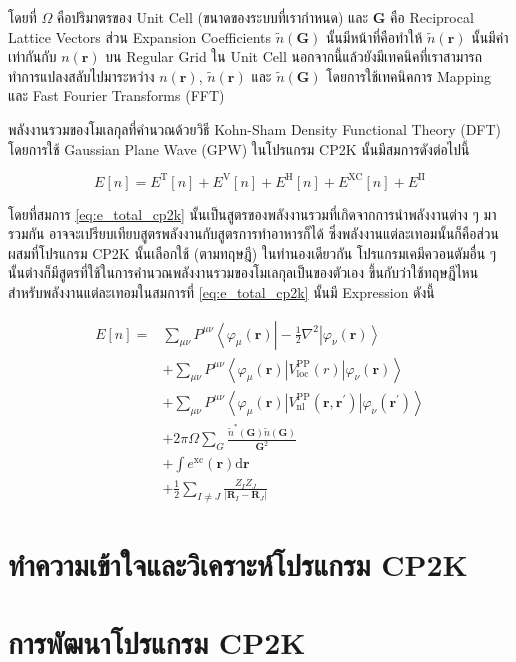 \noindent โดยที่ $\Omega$ คือปริมาตรของ Unit Cell (ขนาดของระบบที่เรากำหนด) และ $\boldsymbol{G}$ คือ Reciprocal Lattice 
Vectors ส่วน Expansion Coefficients $\tilde{n}(\boldsymbol{G})$ นั้นมีหน้าที่คือทำให้ $\tilde{n}(\boldsymbol{r})$ 
นั้นมีค่าเท่ากันกับ $n(\boldsymbol{r})$ บน Regular Grid ใน Unit Cell นอกจากนี้แล้วยังมีเทคนิคที่เราสามารถทำการแปลงสลับไปมาระหว่าง 
$n(\boldsymbol{r})$, $\tilde{n}(\boldsymbol{r})$ และ $\tilde{n}(\boldsymbol{G})$ โดยการใช้เทคนิคการ Mapping และ
Fast Fourier Transforms (FFT)

พลังงานรวมของโมเลกุลที่คำนวณด้วยวิธี Kohn-Sham Density Functional Theory (DFT) โดยการใช้ Gaussian Plane Wave (GPW) 
ในโปรแกรม CP2K นั้นมีสมการดังต่อไปนี้

\begin{equation} 
    \label{eq:e_total_cp2k}
    E[n] 
    = 
    E^{\mathrm{T}}[n]
    + E^{\mathrm{V}}[n] 
    + E^{\mathrm{H}}[n]
    + E^{\mathrm{XC}}[n]
    + E^{\mathrm{II}}
\end{equation}

\noindent โดยที่สมการ \eqref{eq:e_total_cp2k} นั้นเป็นสูตรของพลังงานรวมที่เกิดจากการนำพลังงานต่าง ๆ มารวมกัน 
อาจจะเปรียบเทียบสูตรพลังงานกับสูตรการทำอาหารก็ได้ ซึ่งพลังงานแต่ละเทอมนั้นก็คือส่วนผสมที่โปรแกรม CP2K นั้นเลือกใช้ (ตามทฤษฎี) 
ในทำนองเดียวกัน โปรแกรมเคมีควอนตัมอื่น ๆ นั้นต่างก็มีสูตรที่ใช้ในการคำนวณพลังงานรวมของโมเลกุลเป็นของตัวเอง ขึ้นกับว่าใช้ทฤษฎีไหน 
สำหรับพลังงานแต่ละเทอมในสมการที่ \eqref{eq:e_total_cp2k} นั้นมี Expression ดังนี้

\begin{align}
    \label{eq:e_total_cp2k_full}
    E[n] 
    =&
    \sum_{\mu \nu} P^{\mu \nu}\left\langle\varphi_\mu(\boldsymbol{r})\right| \nonumber
    - \frac{1}{2} \nabla^2\left|\varphi_\nu(\boldsymbol{r})\right\rangle \nonumber \\
    &+ \sum_{\mu \nu} P^{\mu \nu}\left\langle\varphi_\mu(\boldsymbol{r})
    \left|V_{\mathrm{loc}}^{\mathrm{PP}}(r)\right| 
    \varphi_\nu(\boldsymbol{r})\right\rangle \nonumber \\
    &+ \sum_{\mu \nu} P^{\mu \nu}\left\langle\varphi_\mu(\boldsymbol{r})
    \left|V_{\mathrm{nl}}^{\mathrm{PP}}\left(\boldsymbol{r}, \boldsymbol{r}^{\prime}\right)\right| 
    \varphi_\nu\left(\boldsymbol{r}^{\prime}\right)\right\rangle \nonumber \\ 
    &+ 2 \pi \Omega \sum_G \frac{\widetilde{n}^*(\boldsymbol{G}) \tilde{n}(\boldsymbol{G})}{\boldsymbol{G}^2} \\ 
    &+ \int e^{\mathrm{xc}}(\boldsymbol{r}) \mathrm{d} \boldsymbol{r} \nonumber \\ 
    &+ \frac{1}{2} \sum_{I \neq J} \frac{Z_I Z_J}{\left|\boldsymbol{R}_I-\boldsymbol{R}_J\right|}
\end{align}

\section{ทำความเข้าใจและวิเคราะห์โปรแกรม CP2K}

\section{การพัฒนาโปรแกรม CP2K}
